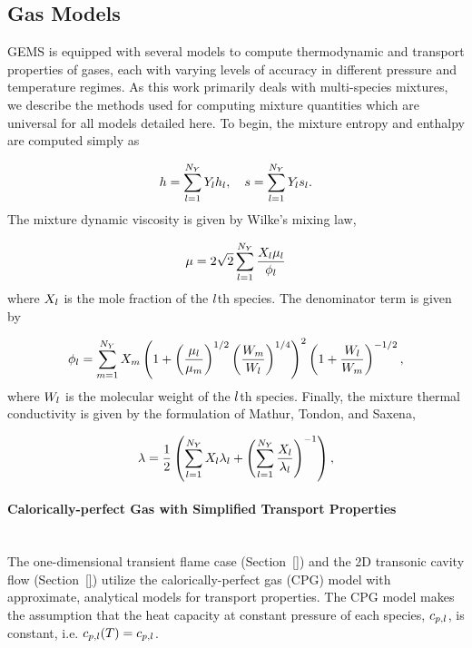 \subsection{Gas Models}\label{subsec:gasModels}

GEMS is equipped with several models to compute thermodynamic and transport properties of gases, each with varying levels of accuracy in different pressure and temperature regimes. As this work primarily deals with multi-species mixtures, we describe the methods used for computing mixture quantities which are universal for all models detailed here. To begin, the mixture entropy and enthalpy are computed simply as

\begin{equation}
	h = \sum_{l = 1}^{N_Y} Y_{l} h_{l}, \quad s = \sum_{l = 1}^{N_Y} Y_{l} s_{l}.
\end{equation}
The mixture dynamic viscosity is given by Wilke's mixing law,

\begin{equation}\label{eq:viscMix}
	\mu = 2 \sqrt{2} \sum_{l = 1}^{N_Y} \frac{X_{l} \mu_{l}}{\phi_{l}}
\end{equation}
where $X_{l}$ is the mole fraction of the $l$th species. The denominator term is given by

\begin{equation}\label{eq:viscMixDenom}
	\phi_{l} = \sum_{m = 1}^{N_Y} X_{m} \left( 1 + \left( \frac{\mu_{l}}{\mu_{m}} \right)^{1/2} \left( \frac{W_{m}}{W_{l}} \right)^{1/4} \right)^2 \left( 1 + \frac{W_{l}}{W_{m}} \right)^{-1/2},
\end{equation}
where $W_{l}$ is the molecular weight of the $l$th species. Finally, the mixture thermal conductivity is given by the formulation of Mathur, Tondon, and Saxena,

\begin{equation}\label{eq:thermCondMix}
    \lambda = \frac{1}{2} \left( \sum_{l = 1}^{N_Y} X_{l} \lambda_{l} + \left(\sum_{l = 1}^{N_Y} \frac{X_{l}}{\lambda_{l}} \right)^{-1} \right),
\end{equation}


\paragraph*{Calorically-perfect Gas with Simplified Transport Properties}\mbox{}\\

The one-dimensional transient flame case (Section~\ref{}) and the 2D transonic cavity flow (Section~\ref{}) utilize the calorically-perfect gas (CPG) model with approximate, analytical models for transport properties. The CPG model makes the assumption that the heat capacity at constant pressure of each species, $c_{p,l}$, is constant, i.e. $c_{p,l}(T) = c_{p,l}$.

